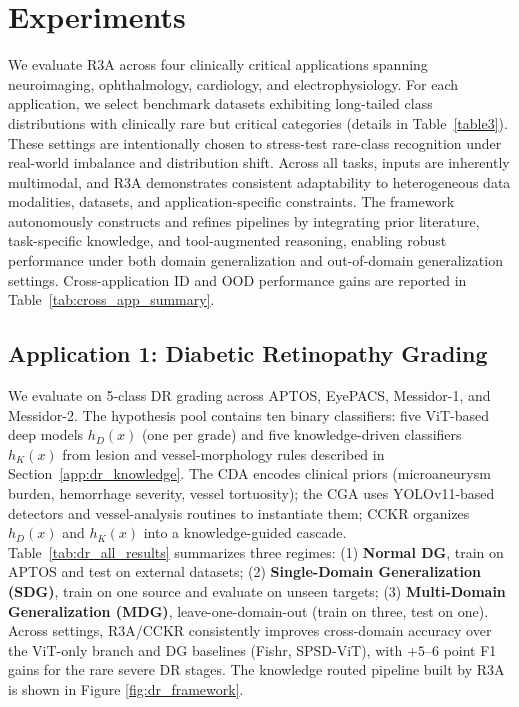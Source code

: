 \documentclass{article}
\begin{document}
\section{Experiments}
We evaluate R3A across four clinically critical applications spanning neuroimaging, ophthalmology, cardiology, and electrophysiology. For each application, we select benchmark datasets exhibiting long-tailed class distributions with clinically rare but critical categories (details in Table~\ref{table3}). These settings are intentionally chosen to stress-test rare-class recognition under real-world imbalance and distribution shift.  Across all tasks, inputs are inherently multimodal, and R3A demonstrates consistent adaptability to heterogeneous data modalities, datasets, and application-specific constraints. The framework autonomously constructs and refines pipelines by integrating prior literature, task-specific knowledge, and tool-augmented reasoning, enabling robust performance under both domain generalization and out-of-domain generalization settings. Cross-application ID and OOD performance gains are reported in Table~\ref{tab:cross_app_summary}.


\subsection{Application 1: Diabetic Retinopathy Grading}

We evaluate on 5-class DR grading across APTOS, EyePACS, Messidor-1, and
Messidor-2. The hypothesis pool contains ten binary classifiers: five
ViT-based deep models $h_D(x)$ (one per grade) and five knowledge-driven
classifiers $h_K(x)$ from lesion and vessel-morphology rules described in Section~\ref{app:dr_knowledge}. The CDA
encodes clinical priors (microaneurysm burden, hemorrhage severity, vessel
tortuosity); the CGA uses YOLOv11-based detectors and vessel-analysis
routines to instantiate them; CCKR organizes $h_D(x)$ and $h_K(x)$ into a
knowledge-guided cascade. Table~\ref{tab:dr_all_results} summarizes three regimes: (1) \textbf{Normal
DG}, train on APTOS and test on external datasets; (2) \textbf{Single-Domain
Generalization (SDG)}, train on one source and evaluate on unseen targets;
(3) \textbf{Multi-Domain Generalization (MDG)}, leave-one-domain-out
(train on three, test on one). Across settings, R3A/CCKR consistently
improves cross-domain accuracy over the ViT-only branch and DG baselines
(Fishr, SPSD-ViT), with $+5$--$6$ point F1 gains for the rare severe DR stages. The knowledge routed pipeline built by R3A is shown in Figure \ref{fig:dr_framework}.
\end{document}
